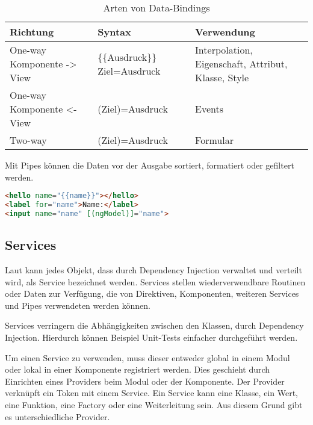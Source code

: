 \begin{table}
\begin{tabular}{|>{\raggedright\arraybackslash}p{3cm}|>{\raggedright\arraybackslash}p{3.2cm}|>{\raggedright\arraybackslash}p{6.5cm}|}
	\hline
	\textbf{Richtung}&\textbf{Syntax}&\textbf{Verwendung}\\
	\hline 
	One-way Komponente -> View &\{\{Ausdruck\}\} \lbrack Ziel\rbrack =\dq Ausdruck\dq  & Interpolation, Eigenschaft, Attribut, Klasse, Style\\ 
	\hline 
	One-way Komponente <- View &(Ziel)=\dq Ausdruck\dq&Events\\ 
	\hline 
	Two-way&\lbrack (Ziel)\rbrack =\dq Ausdruck\dq&Formular\\ 
	\hline 
\end{tabular}
\caption{Arten von Data-Bindings}
\label{tab:DataBinding}
\end{table}

Mit Pipes können die  Daten vor der Ausgabe sortiert, formatiert oder gefiltert werden. \autocite[vgl.][83\psqq]{Steyer.2017}

\begin{lstlisting}[caption=Das Template in der Datei app.component.html, label=lst:AppComponentHTML, language=HTML]
<hello name="{{name}}"></hello>
<label for="name">Name:</label>
<input name="name" [(ngModel)]="name">
\end{lstlisting}

\subsection{Services}
Laut \textcite[vgl.][474]{Freeman.2018} kann jedes Objekt, dass durch Dependency Injection verwaltet und verteilt wird, als Service bezeichnet werden. Services stellen wiederverwendbare Routinen oder Daten zur Verfügung, die von Direktiven, Komponenten, weiteren Services und Pipes verwendeten werden können. \autocites[vgl.][467\psqq]{Freeman.2018}[vgl.][89]{Steyer.2017}

Services verringern die Abhängigkeiten zwischen den Klassen, durch Dependency Injection. Hierdurch können Beispiel Unit-Tests einfacher durchgeführt werden. \autocite[vgl.][469]{Freeman.2018} 

Um einen Service zu verwenden, muss dieser entweder global in einem Modul oder lokal in einer Komponente registriert werden. Dies geschieht durch Einrichten eines Providers beim Modul oder der Komponente. Der Provider verknüpft ein Token mit einem Service. Ein Service kann eine Klasse, ein Wert, eine Funktion, eine Factory oder eine Weiterleitung sein. Aus diesem Grund gibt es unterschiedliche Provider.

